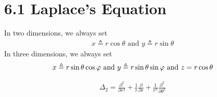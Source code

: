 \documentclass{report}
\begin{document}
\section{6.1 Laplace's Equation}
\begin{mdframed}
In two dimensions, we always set 
\begin{align*}
x\triangleq r \cos \theta \text{ and } y\triangleq r \sin \theta
\end{align*}
In three dimensions, we always set 
\begin{align*}
x\triangleq r \sin \theta \cos \pfi \text{ and } y \triangleq r\sin \theta \sin \pfi \text{ and }z=r \cos \theta
\end{align*}
\end{mdframed}
\begin{theorem}
\begin{align*}
\Delta_2 = \frac{\partial ^2}{\partial r^2} + \frac{1}{r} \frac{\partial }{\partial r} + \frac{1}{r^2} \frac{\partial ^2}{\partial \theta^2}
\end{align*}
\end{theorem}
\end{document}
